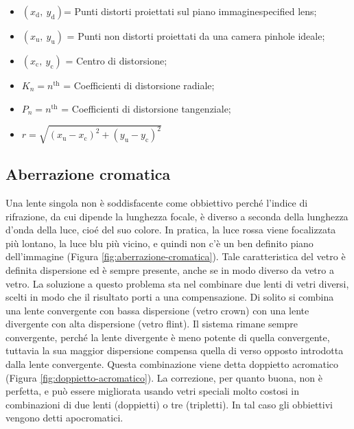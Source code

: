 \begin{itemize}

\item $(x_\mathrm{d},\ y_\mathrm{d})$=  Punti distorti proiettati sul piano immaginespecified lens;
\item $(x_\mathrm{u},\ y_\mathrm{u})$ = Punti non distorti proiettati da una camera pinhole ideale;
\item $(x_\mathrm{c},\ y_\mathrm{c})$ = Centro di distorsione;
\item $K_n = n^{\mathrm{th}}$ = Coefficienti di distorsione radiale;
\item $P_n = n^{\mathrm{th}}$ = Coefficienti di distorsione tangenziale;
\item $r = \sqrt{(x_\mathrm{u}-x_\mathrm{c})^2 + (y_\mathrm{u}-y_\mathrm{c})^2}$
\end{itemize}


\subsection{Aberrazione cromatica}

Una lente singola non è soddisfacente come obbiettivo perché l'indice di rifrazione, da
cui dipende la lunghezza focale, è diverso a seconda della lunghezza d'onda della luce, cioé del suo
colore. In pratica, la luce rossa viene focalizzata più lontano, la luce blu più vicino, e quindi non c'è
un ben definito piano dell'immagine (Figura \ref{fig:aberrazione-cromatica}). Tale caratteristica del vetro è definita dispersione
ed è sempre presente, anche se in modo diverso da vetro a vetro. La soluzione a questo problema sta
nel combinare due lenti di vetri diversi, scelti in modo che il risultato porti a una compensazione. Di solito si combina una lente convergente con bassa dispersione (vetro crown) con una lente divergente con alta dispersione (vetro flint). Il sistema rimane sempre convergente, perché la lente divergente è meno potente di quella convergente, tuttavia la sua maggior dispersione compensa quella di verso opposto introdotta dalla lente convergente. Questa combinazione viene detta doppietto acromatico (Figura \ref{fig:doppietto-acromatico}). La correzione, per quanto buona, non è perfetta, e può essere migliorata usando vetri speciali molto costosi in combinazioni di due lenti (doppietti) o tre (tripletti). In tal caso gli obbiettivi vengono detti apocromatici.



